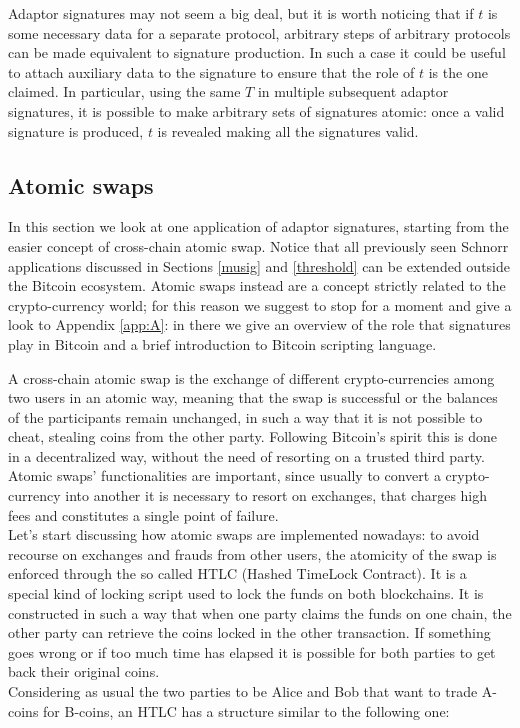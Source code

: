\bigskip
\noindent
Adaptor signatures may not seem a big deal, but it is worth noticing that if $t$ is some necessary data for a separate protocol, arbitrary steps of arbitrary protocols can be made equivalent to signature production. In such a case it could be useful to attach auxiliary data to the signature to ensure that the role of $t$ is the one claimed. In particular, using the same $T$ in multiple subsequent adaptor signatures, it is possible to make arbitrary sets of signatures atomic: once a valid signature is produced, $t$ is revealed making all the signatures valid. 

\bigskip

\subsection{Atomic swaps}
\label{atomic}
In this section we look at one application of adaptor signatures, starting from the easier concept of cross-chain atomic swap. Notice that all previously seen Schnorr applications discussed in Sections \ref{musig} and \ref{threshold} can be extended outside the Bitcoin ecosystem. Atomic swaps instead are a concept strictly related to the crypto-currency world; for this reason we suggest to stop for a moment and give a look to Appendix \ref{app:A}: in there we give an overview of the role that signatures play in Bitcoin and a brief introduction to Bitcoin scripting language.

\bigskip
\noindent
A cross-chain atomic swap is the exchange of different crypto-currencies among two users in an atomic way, meaning that the swap is successful or the balances of the participants remain unchanged, in such a way that it is not possible to cheat, stealing coins from the other party. Following Bitcoin's spirit this is done in a decentralized way, without the need of resorting on a trusted third party. Atomic swaps' functionalities are important, since usually to convert a crypto-currency into another it is necessary to resort on exchanges, that charges high fees and constitutes a single point of failure.
\\
Let's start discussing how atomic swaps are implemented nowadays: to avoid recourse on exchanges and frauds from other users, the atomicity of the swap is enforced through the so called HTLC (Hashed TimeLock Contract). It is a special kind of locking script used to lock the funds on both blockchains. It is constructed in such a way that when one party claims the funds on one chain, the other party can retrieve the coins locked in the other transaction. If something goes wrong or if too much time has elapsed it is possible for both parties to get back their original coins.
\\
Considering as usual the two parties to be Alice and Bob that want to trade A-coins for B-coins, an HTLC has a structure similar to the following one:

